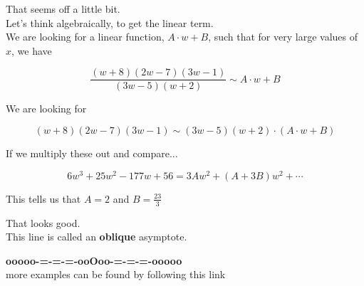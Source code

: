 \documentclass{ximera}
\begin{document}
That seems off a little bit. \\


Let's think algebraically, to get the linear term. \\



We are looking for a linear function, $A \cdot w + B$, such that for very large values of $x$, we have










\[ \frac{(w+8)(2w-7)(3w-1)}{(3w-5)(w+2)}    \sim    A \cdot w + B  \]




We are looking for 



\[ (w+8)(2w-7)(3w-1)   \sim   (3w-5)(w+2) \cdot  (A \cdot w + B)  \]



If we multiply these out and compare...


\[
6 w^3 + 25 w^2 - 177 w + 56 = 3A w^2 + (A + 3B) w^2 + \cdots
\]


This tells us that $A = 2$ and $B = \frac{23}{3}$




\begin{center}
\end{center}


That looks good.  \\

This line is called an \textbf{oblique} asymptote.






















\begin{center}
\textbf{\textcolor{green!50!black}{ooooo-=-=-=-ooOoo-=-=-=-ooooo}} \\

more examples can be found by following this link\\ 

\end{center}
\end{document}
